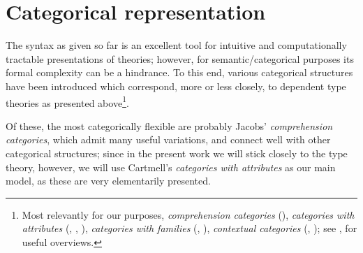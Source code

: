 % 
% 
% 
% 
% 


\section{Categorical representation}

\begin{para} \label{para:categorical-repns} The syntax as given so far is an excellent tool for intuitive and computationally tractable presentations of theories; however, for semantic/categorical purposes its formal complexity can be a hindrance.  To this end, various categorical structures have been introduced which correspond, more or less closely, to dependent type theories as presented above\footnote{Most relevantly for our purposes, \emph{comprehension categories} (\cite{jacobs:comprehension-categories}), \emph{categories with attributes} (\cite{cartmell:thesis}, \cite{moggi:program-modules}, \cite{pitts:categorial-logic}), \emph{categories with families} (\cite{dybjer:internal-type-theory}, \cite{hofmann:syntax-and-semantics}), \emph{contextual categories} (\cite{cartmell:generalised-algebraic-theories}, \cite{streicher:semantics-book}); see \cite{jacobs:comprehension-categories}, \cite{hofmann:syntax-and-semantics} for useful overviews.}.

Of these, the most categorically flexible are probably Jacobs' \emph{comprehension categories}, which admit many useful variations, and connect well with other categorical structures; since in the present work we will stick closely to the type theory, however, we will use Cartmell's \emph{categories with attributes} as our main model, as these are very elementarily presented.   %
\end{para}

